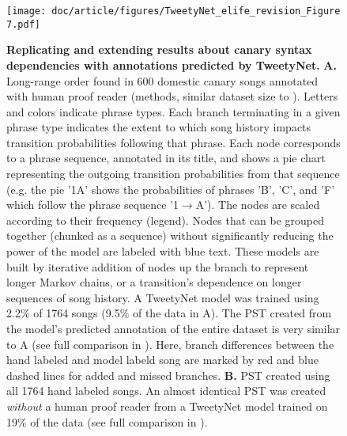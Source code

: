 \documentclass[9pt,lineno]{elife}
\begin{document}
\begin{figure}[!ht] %
\texttt{[image: doc/article/figures/TweetyNet\_elife\_revision\_Figure 7.pdf]}
\caption{{\bf Replicating and extending results about canary syntax dependencies with annotations predicted by TweetyNet.}
\textbf{A.} Long-range order found in 600 domestic canary songs annotated with human proof reader (methods, similar dataset size to \citep{markowitz_long-range_2013}). Letters and colors indicate phrase types. Each branch terminating in a given phrase type indicates the extent to which song history impacts transition probabilities following that phrase. Each node corresponds to a phrase sequence, annotated in its title, and shows a pie chart representing the outgoing transition probabilities from that sequence (e.g. the pie '1A' shows the probabilities of phrases 'B', 'C', and 'F' which follow the phrase sequence '1$\rightarrow$A'). The nodes are scaled according to their frequency (legend). Nodes that can be grouped together (chunked as a sequence) without significantly reducing the power of the model are labeled with blue text. These models are built by iterative addition of nodes up the branch to represent longer Markov chains, or a transition’s dependence on longer sequences of song history. A TweetyNet model was trained using 2.2\% of 1764 songs (9.5\% of the data in A). The PST created from the model's predicted annotation of the entire dataset is very similar to A (see full comparison in ). Here, branch differences between the hand labeled and model labeld song are marked by red and blue dashed lines for added and missed branches. \textbf{B.} PST created using all 1764 hand labeled songs. An almost identical PST was created \textit{without} a human proof reader from a TweetyNet model trained on 19\% of the data (see full comparison in ).}
\label{fig:automatic_canary_syntax}

\label{figsupp:sf1}


\end{figure}
\end{document}
